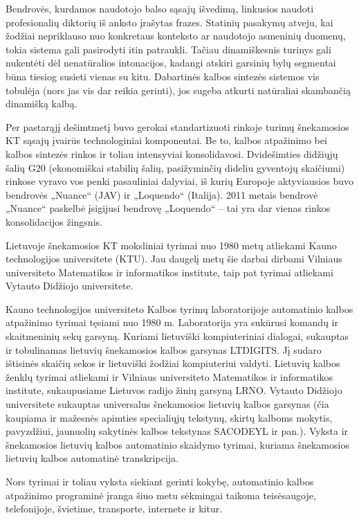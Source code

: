 \begin{multicols}{2}
Bendrovės, kurdamos naudotojo balso sąsajų išvedimą, linkusios naudoti profesionalių diktorių iš anksto įrašytas frazes. Statinių pasakymų atveju, kai žodžiai nepriklauso nuo konkretaus konteksto ar naudotojo asmeninių duomenų, tokia sistema gali pasirodyti itin patraukli. Tačiau dinamiškesnis turinys gali nukentėti dėl nenatūralios intonacijos, kadangi atskiri garsinių bylų segmentai būna tiesiog susieti vienas su kitu. Dabartinės kalbos sintezės sistemos vis tobulėja (nors jas vis dar reikia gerinti), jos sugeba atkurti natūraliai skambančią dinamišką kalbą.   

    Per pastarąjį dešimtmetį buvo gerokai standartizuoti rinkoje turimų šnekamosios KT sąsajų įvairūs technologiniai komponentai. Be to, kalbos atpažinimo bei kalbos sintezės rinkos ir toliau intensyviai konsolidavosi. Dvidešimties didžiųjų šalių G20 (ekonomiškai stabilių šalių, pasižyminčių dideliu gyventojų skaičiumi) rinkose vyravo vos penki pasauliniai dalyviai, iš kurių Europoje aktyviausios buvo bendrovės „Nuance“ (JAV) ir „Loquendo“ (Italija). 2011 metais bendrovė „Nuance“ paskelbė įsigijusi bendrovę „Loquendo“ – tai yra dar vienas rinkos konsolidacijos žingsnis.   

    Lietuvoje šnekamosios KT moksliniai tyrimai nuo 1980 metų atliekami Kauno technologijos universitete (KTU). Jau daugelį metų šie darbai dirbami Vilniaus universiteto Matematikos ir informatikos institute, taip pat tyrimai atliekami Vytauto Didžiojo universitete.   

    Kauno technologijos universiteto Kalbos tyrimų laboratorijoje automatinio kalbos atpažinimo tyrimai tęsiami nuo 1980 m. Laboratorija yra sukūrusi komandų ir skaitmeninių sekų garsyną. Kuriami lietuviški kompiuteriniai dialogai, sukauptas ir tobulinamas lietuvių šnekamosios kalbos garsynas LTDIGITS. Jį sudaro ištisinės skaičių sekos ir lietuviški žodžiai kompiuteriui valdyti. Lietuvių kalbos ženklų tyrimai atliekami ir Vilniaus universiteto Matematikos ir informatikos institute, sukaupusiame Lietuvos radijo žinių garsyną LRNO. Vytauto Didžiojo universitete sukauptas universalus šnekamosios lietuvių kalbos garsynas (čia kaupiama ir mažesnės apimties specialiųjų tekstynų, skirtų kalboms mokytis, pavyzdžiui, jaunuolių sakytinės kalbos tekstynas SACODEYL ir pan.). Vyksta ir šnekamosios lietuvių kalbos automatinio skaidymo tyrimai, kuriama šnekamosios lietuvių kalbos automatinė transkripcija.   

    Nors tyrimai ir toliau vyksta siekiant gerinti kokybę, automatinio kalbos atpažinimo programinė įranga šiuo metu sėkmingai taikoma teisėsaugoje, telefonijoje, švietime, transporte, internete ir kitur.   


\end{multicols}
